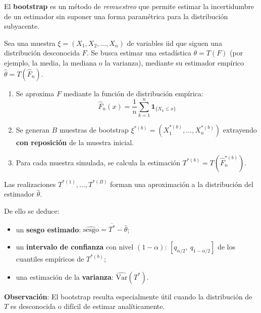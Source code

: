\begin{f}[El bootstrap]
	
	El \textbf{bootstrap} es un método de \textit{remuestreo} que permite estimar la incertidumbre de un estimador sin suponer una forma paramétrica para la distribución subyacente.
	
	Sea una muestra \(\xi = (X_1, X_2, \ldots, X_n)\) de variables iid que siguen una distribución desconocida \(F\). Se busca estimar una estadística \(\theta = T(F)\) (por ejemplo, la media, la mediana o la varianza), mediante su estimador empírico \(\hat{\theta} = T(\hat{F}_n)\).
	
	\begin{enumerate}
		\item Se aproxima \(F\) mediante la función de distribución empírica:
		\[
		\hat{F}_n(x) = \frac{1}{n} \sum_{k=1}^n \mathbf{1}_{\{X_k \le x\}}
		\]
		
		\item Se generan \(B\) muestras de bootstrap \(\xi^{\ast(b)} = (X_1^{\ast(b)}, \ldots, X_n^{\ast(b)})\) extrayendo \textbf{con reposición} de la muestra inicial.
		
		\item Para cada muestra simulada, se calcula la estimación \(T^{\ast(b)} = T(\hat{F}_n^{\ast(b)})\).
	\end{enumerate}
	
	Las realizaciones \(T^{\ast(1)}, \ldots, T^{\ast(B)}\) forman una aproximación a la distribución del estimador \(\hat{\theta}\).
	
	De ello se deduce:
	\begin{itemize}[nosep]
		\item un \textbf{sesgo estimado}: \(\widehat{\text{sesgo}} = \overline{T^\ast} - \hat{\theta}\);
		\item un \textbf{intervalo de confianza} con nivel \((1-\alpha)\): \([q_{\alpha/2},\ q_{1 - \alpha/2}]\) de los cuantiles empíricos de \(T^{\ast(b)}\);
		\item una estimación de la \textbf{varianza}: \(\widehat{\mathrm{Var}}(T^\ast)\).
	\end{itemize}
	
	\textbf{Observación}: El bootstrap resulta especialmente útil cuando la distribución de \(T\) es desconocida o difícil de estimar analíticamente.
	
\end{f}
